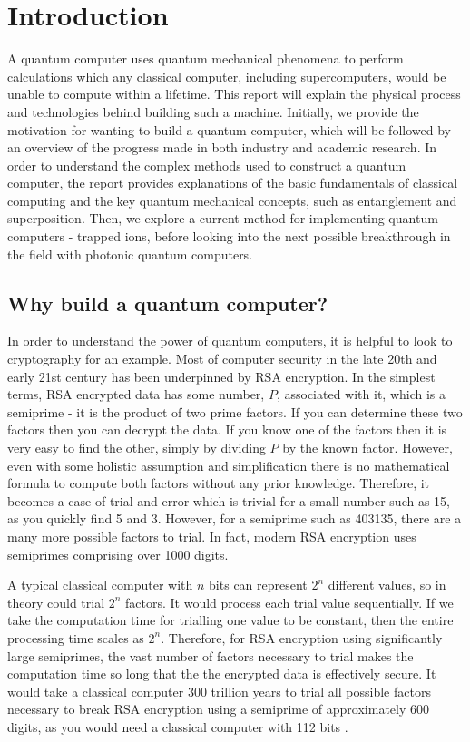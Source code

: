 \section{Introduction}
A quantum computer uses quantum mechanical phenomena to perform calculations which any classical computer, including supercomputers, would be unable to compute within a lifetime. \cite{noauthor_what_nodate}
This report will explain the physical process and technologies behind building such a machine. Initially, we provide the motivation for wanting to build a quantum computer, which will be followed by an overview of the progress made in both industry and academic research. In order to understand the complex methods used to construct a quantum computer, the report provides explanations of the basic fundamentals of classical computing and the key quantum mechanical concepts, such as entanglement and superposition. Then, we explore a current method for implementing quantum computers - trapped ions, before looking into the next possible breakthrough in the field with photonic quantum computers.

\subsection{Why build a quantum computer?}\label{sec:why}
In order to understand the power of quantum computers, it is helpful to look to cryptography for an example. Most of computer security in the late 20th and early 21st century has been underpinned by RSA encryption. In the simplest terms, RSA encrypted data has some number, $P$, associated with it, which is a semiprime - it is the product of two prime factors. If you can determine these two factors then you can decrypt the data. If you know one of the factors then it is very easy to find the other, simply by dividing $P$ by the known factor. However, even with some holistic assumption and simplification there is no mathematical formula to compute both factors without any prior knowledge. Therefore, it becomes a case of trial and error which is trivial for a small number such as 15, as you quickly find 5 and 3. However, for a semiprime such as 403135, there are a many more possible factors to trial. In fact, modern RSA encryption uses semiprimes comprising over 1000 digits.

A typical classical computer with $n$ bits can represent $2^n$ different values, so in theory could trial $2^n$ factors. It would process each trial value sequentially. If we take the computation time for trialling one value to be constant, then the entire processing time scales as $2^n$. Therefore, for RSA encryption using significantly large semiprimes, the vast number of factors necessary to trial makes the computation time so long that the the encrypted data is effectively secure. It would take a classical computer 300 trillion years to trial all possible factors necessary to break RSA encryption using a semiprime of approximately 600 digits, as you would need a classical computer with 112 bits \cite{mahto2016security}\cite{quintessencelabs_2022}.

